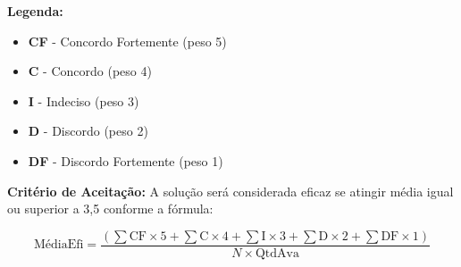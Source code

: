 \textbf{Legenda:}
\begin{itemize}
    \item \textbf{CF} - Concordo Fortemente (peso 5)
    \item \textbf{C} - Concordo (peso 4)
    \item \textbf{I} - Indeciso (peso 3)
    \item \textbf{D} - Discordo (peso 2)
    \item \textbf{DF} - Discordo Fortemente (peso 1)
\end{itemize}

\vspace{1em}

\textbf{Critério de Aceitação:} A solução será considerada eficaz se atingir média igual ou superior a 3,5 conforme a fórmula:

\begin{equation}
\text{MédiaEfi} = \frac{(\sum \text{CF} \times 5 + \sum \text{C} \times 4 + \sum \text{I} \times 3 + \sum \text{D} \times 2 + \sum \text{DF} \times 1)}{N \times \text{QtdAva}}
\end{equation}

\renewcommand{\baselinestretch}{1.0}\selectfont
\setlength{\parskip}{\baselineskip}
